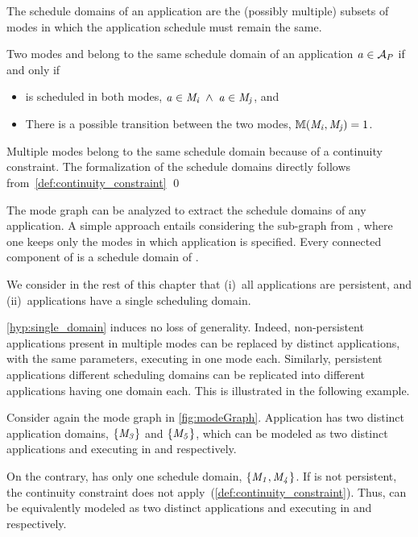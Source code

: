 \begin{definition}
\label{def:sched_domains}
The schedule domains of an application are the (possibly multiple) subsets of modes in which the application schedule must remain the same.
\end{definition}

\begin{corollary}
	Two modes \modei and \modej belong to the same schedule domain of an application $\mathit{a_{}} \in \mathcal{A}_{P}$ if and only if
	\begin{itemize}
		\item \app is scheduled in both modes, \ie $\mathit{a_{}} \in \mathit{M_{i}} \; \wedge \; \mathit{a_{}} \in \mathit{M_{j}}$, and
		\item There is a possible transition between the two modes, \ie $\mathbb{M}(\mathit{M_{i}}, \mathit{M_{j}}) = 1$.
	\end{itemize}
\end{corollary}

\proof
Multiple modes belong to the same schedule domain because of a continuity constraint.
The formalization of the schedule domains directly follows from~\cref{def:continuity_constraint}
\qed

The mode graph can be analyzed to extract the schedule domains of any application.
A simple approach entails considering the sub-graph \modeGraphA from \modeGraph, \ie where one keeps only the modes in which application \app is specified.
Every connected component of \modeGraphA is a schedule domain of \app.

\begin{hypothesis}
	\label{hyp:single_domain}
	We consider in the rest of this chapter that (i)~all applications are persistent, and (ii)~applications have a single scheduling domain.
\end{hypothesis}

\cref{hyp:single_domain} induces no loss of generality. Indeed, non-persistent applications present in multiple modes can be replaced by distinct applications, with the same parameters, executing in one mode each.
Similarly, persistent applications different scheduling domains can be replicated into different applications having one domain each.
This is illustrated in the following example.

\begin{example}\label{exp:sched_domain}
Consider again the mode graph in \cref{fig:modeGraph}. Application  has two distinct application domains, $\{\mathit{M_{3}}\}$ and $\{\mathit{M_{5}}\}$, which can be modeled as two distinct applications  and  executing in  and  respectively.

On the contrary,  has only one schedule domain, $\{\mathit{M_{1}},\mathit{M_{4}}\}$.
If  is not persistent, the continuity constraint does not apply~(\cref{def:continuity_constraint}).
Thus,  can be equivalently modeled as two distinct applications  and  executing in  and  respectively.
\end{example}


